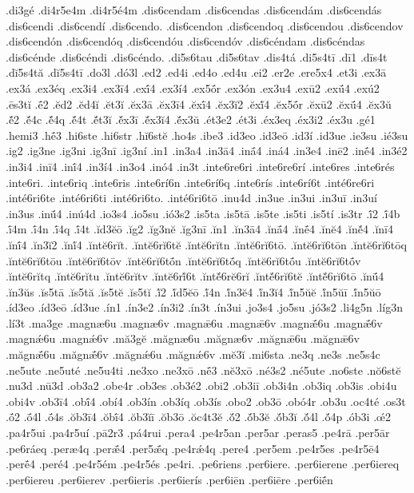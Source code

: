 {.di3gé
.di4r5e4m
.di4r5é4m
.dis6cendam
.dis6cendas
.dis6cendám
.dis6cendás
.dis6cendi
.dis6cendí
.dis6cendo.
.dis6cendon
.dis6cendoq
.dis6cendou
.dis6cendov
.dis6cendón
.dis6cendóq
.dis6cendóu
.dis6cendóv
.dis6céndam
.dis6céndas
.dis6cénde
.dis6céndi
.dis6céndo.
.di5s6tau
.di5s6tav
.dis4tá
.di5s4tī
.dī1
.dīs4t
.dĭ5s4tă
.dĭ5s4tī
.do3l
.dó3l
.ed2
.ed4i
.ed4o
.ed4u
.ei2
.er2e
.ere5x4
.et3i
.ex3ā
.ex3á
.ex3éq
.ex3i4
.ex3ī4
.exī́4
.ex3í4
.ex5ṓr
.ex3ón
.ex3u4
.exū2
.exū́4
.exú2
.ēs3tĭ
.ḗ2
.ĕd2
.ĕd4ĭ
.ĕt3ĭ
.ĕx3ā
.ĕx3ī4
.ĕxī́4
.ĕx3ĭ2
.ĕxĭ́4
.ĕx5ṓr
.ĕxū2
.ĕxū́4
.ĕx3ŭ
.ĕ́2
.ĕ́4c
.ĕ́4q
.ĕ́4t
.ĕ́t3ĭ
.ĕ́x3ī
.ĕ́x3ĭ4
.ĕ́x3ŭ
.ét3e2
.ét3i
.éx3eq
.éx3i2
.éx3u
.gé1
.hemi3
.hḗ3
.hi6ste
.hi6str
.hĭ6stĕ
.ho4s
.ibe3
.id3eo
.id3eō
.id3í
.id3ue
.ie3su
.ié3su
.ig2
.ig3ne
.ig3ni
.ig3nī
.ig3ní
.in1
.in3a4
.in3ā4
.inā́4
.iná4
.in3e4
.inē2
.inḗ4
.in3é2
.in3i4
.inī4
.inī́4
.in3í4
.in3o4
.inó4
.in3t
.inte6re6ri
.inte6re6rí
.inte6res
.inte6rés
.inte6ri.
.inte6riq
.inte6ris
.inte6rí6n
.inte6rí6q
.inte6rís
.inte6rí6t
.inté6re6ri
.inté6ri6te
.inté6ri6ti
.inté6ri6to.
.inté6ri6tō
.inu4d
.in3ue
.in3ui
.in3uī
.in3uí
.in3us
.inū́4
.inú4d
.io3s4
.io5su
.ió3s2
.is5ta
.is5tā
.is5te
.is5ti
.is5tí
.is3tr
.ī́2
.ī́4b
.ī́4m
.ī́4n
.ī́4q
.ī́4t
.ĭd3ĕō
.ĭg2
.ĭg3nĕ
.ĭg3nī
.ĭn1
.ĭn3ā4
.ĭnā́4
.ĭnḗ4
.ĭnĕ4
.ĭnĕ́4
.ĭnī4
.ĭnī́4
.ĭn3ĭ2
.ĭnĭ́4
.ĭntĕ6rĭt.
.ĭntĕ6rĭ6tĕ
.ĭntĕ6rĭtn
.ĭntĕ6rĭ6tō.
.ĭntĕ6rĭ6tōn
.ĭntĕ6rĭ6tōq
.ĭntĕ6rĭ6tōu
.ĭntĕ6rĭ6tōv
.ĭntĕ6rĭ6tṓn
.ĭntĕ6rĭ6tṓq
.ĭntĕ6rĭ6tṓu
.ĭntĕ6rĭ6tṓv
.ĭntĕ6rĭtq
.ĭntĕ6rĭtu
.ĭntĕ6rĭtv
.ĭntĕ6rĭ́6t
.ĭntĕ́6rĕ6rĭ
.ĭntĕ́6rĭ6tĕ
.ĭntĕ́6rĭ6tō
.ĭnū́4
.ĭn3ŭs
.ĭs5tā
.ĭs5tă
.ĭs5tĕ
.ĭs5tĭ
.ĭ́2
.ĭ́d5ĕō
.ĭ́4n
.ĭ́n3ĕ4
.ĭ́n3ĭ4
.ĭ́n5ŭĕ
.ĭ́n5ŭī
.ĭ́n5ŭō
.íd3eo
.íd3eō
.íd3ue
.ín1
.ín3e2
.ín3i2
.ín3t
.ín3ui
.jo3s4
.jo5su
.jó3s2
.li4g5n
.líg3n
.lí3t
.ma3ge
.magnæ6u
.magnæ6v
.magnǣ6u
.magnǣ6v
.magnǣ́6u
.magnǣ́6v
.magnǽ6u
.magnǽ6v
.mă3gĕ
.măgnæ6u
.măgnæ6v
.măgnǣ6u
.măgnǣ6v
.măgnǣ́6u
.măgnǣ́6v
.măgnǽ6u
.măgnǽ6v
.mĕ3ĭ
.mi6sta
.ne3q
.ne3s
.ne5s4c
.ne5ute
.ne5uté
.ne5u4ti
.ne3xo
.ne3xō
.nḗ3
.nĕ3xō
.né3s2
.né5ute
.no6ste
.nŏ6stĕ
.nu3d
.nū3d
.ob3a2
.obe4r
.ob3es
.ob3é2
.obi2
.ob3iī
.ob3i4n
.ob3iq
.ob3is
.obi4u
.obi4v
.ob3ī4
.obī́4
.obí4
.ob3ín
.ob3íq
.ob3ís
.obo2
.ob3ō
.obó4r
.ob3u
.oc4té
.os3t
.ṓ2
.ṓ4l
.ṓ4s
.ŏb3ī4
.ŏbī́4
.ŏb3ĭī
.ŏb3ō
.ŏc4t3ĕ
.ŏ́2
.ŏ́b3ĕ
.ŏ́b3ĭ
.ŏ́4l
.ŏ́4p
.ób3i
.œ́2
.pa4r5ui
.pa4r5uí
.pā2r3
.pá4rui
.pera4
.pe4r5an
.per5ar
.peras5
.pe4rā
.per5ār
.pe6ráeq
.peræ4q
.perǣ́4
.per5ǣ́q
.pe4rǽ4q
.pere4
.per5em
.pe4r5es
.pe4r5ē4
.perḗ4
.peré4
.pe4r5ém
.pe4r5és
.pe4ri.
.pe6riens
.per6iere.
.per6ierene
.per6iereq
.per6iereu
.per6ierev
.per6ieris
.per6ierís
.per6iēn
.per6iēre
.per6iḗn
}
